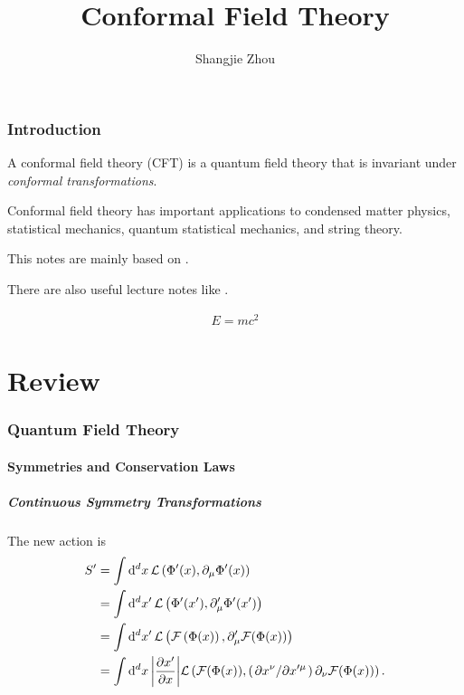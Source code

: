 \documentclass[10pt]{article}
\newenvironment{boxmath}[1]{\begin{tcolorbox}[enhanced,boxrule=1pt,title={\centering #1},colframe=NavyBlue!70!black,colback=NavyBlue!10,colbacktitle=NavyBlue!10,fonttitle=\bfseries,coltitle=Black]}{\end{tcolorbox}}
\begin{document}
\title{Conformal Field Theory}
\author{Shangjie Zhou}

\maketitle

\section*{Introduction}
A conformal field theory (CFT) is a quantum field theory that is invariant under \textit{conformal transformations}.

Conformal field theory has important applications to condensed matter physics, statistical mechanics, quantum statistical mechanics, and string theory. 

This notes are mainly based on \cite{DiFrancesco:1997nk}.

There are also useful lecture notes like \cite{Qualls:2015qjb,Tong:2009np}.
\begin{boxmath}{Conformal Algebra}
\begin{align}
    E=mc^2
\end{align}
\end{boxmath}
\part{Review}
\section{Quantum Field Theory}
\subsection{Symmetries and Conservation Laws}
\subsubsection{Continuous Symmetry Transformations}
The new action is 
\begin{align}
    S'&=\int\dd[d]{x}\mathcal{L}\left(\Phi'(x),\partial_\mu\Phi'(x)\right)\notag\\
        &=\int\dd[d]{x'}\mathcal{L}\left(\Phi'(x'),\partial'_\mu\Phi'(x')\right)\notag\\
        &=\int\dd[d]{x'}\mathcal{L}\left(\mathcal{F}\left(\Phi(x)\right),\partial'_\mu\mathcal{F}(\Phi(x))\right)\notag\\
        &=\int\dd[d]{x}\abs{\pdv{x'}{x}}\mathcal{L}\left(\mathcal{F}(\Phi(x)),\left(\pdv*{x^\nu}{x'^\mu}\right)\partial_\nu\mathcal{F}(\Phi(x))\right).\label{eq:CST:new_action}
\end{align}
\end{document}

